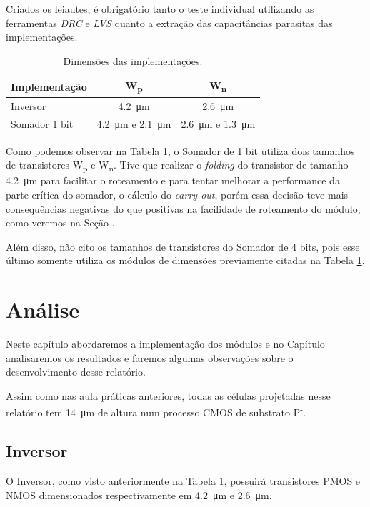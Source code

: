 \documentclass{iiufrgs}
\begin{document}
Criados os leiautes, é obrigatório tanto o teste individual utilizando as ferramentas \textit{DRC} e \textit{LVS} quanto a extração das capacitâncias parasitas das implementações.

\begin{table}[ht]
    \centering
    \caption{Dimensões das implementações.}
    \label{tab:imp}
    \begin{tabular}{l c c}
        \hline
        Implementação
        & W\textsubscript{p}
        & W\textsubscript{n} \\ \hline
        Inversor        & \SI{4.2}{\um}                 & \SI{2.6}{\um}                  \\
        Somador 1 bit   & \SI{4.2}{\um} e \SI{2.1}{\um} & \SI{2.6}{\um} e \SI{1.3}{\um}  \\ \hline
    \end{tabular}
\end{table}

Como podemos observar na Tabela \ref{tab:imp}, o Somador de 1 bit utiliza dois tamanhos de transistores W\textsubscript{p} e W\textsubscript{n}. Tive que realizar o \textit{folding} do transistor de tamanho \SI{4.2}{\um} para facilitar o roteamento e para tentar melhorar a performance da parte crítica do somador, o cálculo do \textit{carry-out}, porém essa decisão teve mais consequências negativas do que positivas na facilidade de roteamento do módulo, como veremos na Seção .

Além disso, não cito os tamanhos de transistores do Somador de 4 bits, pois esse último somente utiliza os módulos de dimensões previamente citadas na Tabela \ref{tab:imp}.

\chapter{Análise}\label{analise}
Neste capítulo abordaremos a implementação dos módulos e no Capítulo  analisaremos os resultados e faremos algumas observações sobre o desenvolvimento desse relatório.

Assim como nas aula práticas anteriores, todas as células projetadas nesse relatório tem \SI{14}{\um} de altura num processo CMOS de substrato P\textsuperscript{-}.

\section{Inversor}\label{inversor}
O Inversor, como visto anteriormente na Tabela \ref{tab:imp}, possuirá transistores PMOS e NMOS dimensionados respectivamente em \SI{4.2}{\um} e \SI{2.6}{\um}.
\end{document}

